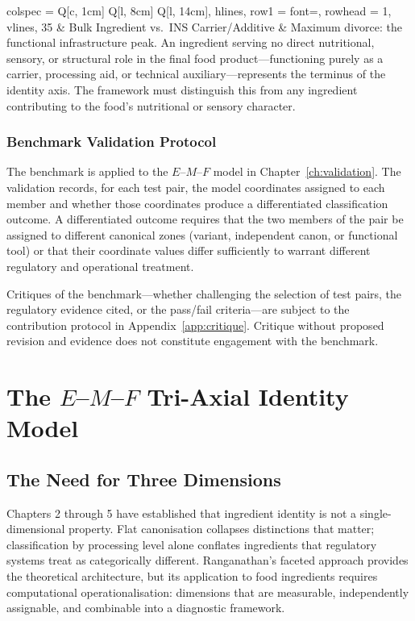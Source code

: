 \documentclass[12pt,a3paper]{article}
\begin{document}
\begin{longtblr}[
  caption = {Identity Discrimination Benchmark: 35 adversarial test pairs.},
  label = {tab:benchmark},
]{
  colspec = {Q[c, 1cm] Q[l, 8cm] Q[l, 14cm]},
  hlines,
  row{1} = {font=\bfseries},
  rowhead = 1,
  vlines,
}
35 & Bulk Ingredient vs.\ INS Carrier/Additive & Maximum divorce: the functional infrastructure peak. An ingredient serving no direct nutritional, sensory, or structural role in the final food product---functioning purely as a carrier, processing aid, or technical auxiliary---represents the terminus of the identity axis. The framework must distinguish this from any ingredient contributing to the food's nutritional or sensory character. \\

\end{longtblr}

\subsubsection{Benchmark Validation Protocol}

The benchmark is applied to the $E$--$M$--$F$ model in Chapter~\ref{ch:validation}. The validation records, for each test pair, the model coordinates assigned to each member and whether those coordinates produce a differentiated classification outcome. A differentiated outcome requires that the two members of the pair be assigned to different canonical zones (variant, independent canon, or functional tool) or that their coordinate values differ sufficiently to warrant different regulatory and operational treatment.

Critiques of the benchmark---whether challenging the selection of test pairs, the regulatory evidence cited, or the pass/fail criteria---are subject to the contribution protocol in Appendix~\ref{app:critique}. Critique without proposed revision and evidence does not constitute engagement with the benchmark.

\newpage


\section{The $E$--$M$--$F$ Tri-Axial Identity Model}
\label{ch:emf}

\subsection{The Need for Three Dimensions}

Chapters 2 through 5 have established that ingredient identity is not a single-dimensional property. Flat canonisation collapses distinctions that matter; classification by processing level alone conflates ingredients that regulatory systems treat as categorically different. Ranganathan's faceted approach provides the theoretical architecture, but its application to food ingredients requires computational operationalisation: dimensions that are measurable, independently assignable, and combinable into a diagnostic framework.
\end{document}
